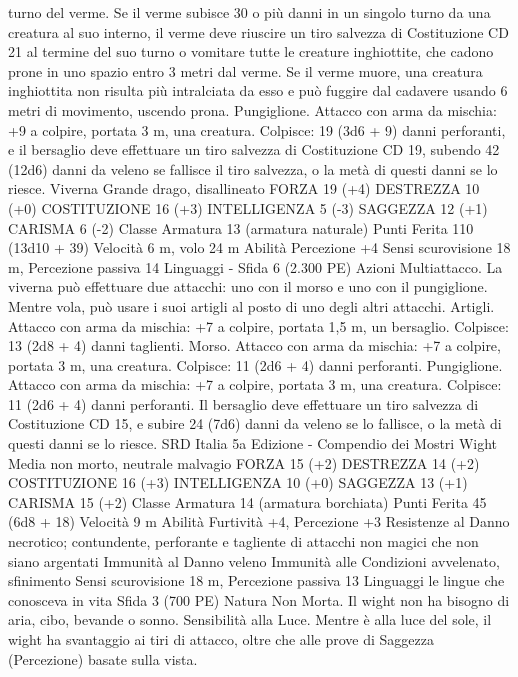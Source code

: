 \begin{multicols}{2}
turno del verme.
Se il verme subisce 30 o più danni in un singolo turno da una
creatura al suo interno, il verme deve riuscire un tiro salvezza di
Costituzione CD 21 al termine del suo turno o vomitare tutte le
creature inghiottite, che cadono prone in uno spazio entro 3 metri
dal verme. Se il verme muore, una creatura inghiottita non risulta
più intralciata da esso e può fuggire dal cadavere usando 6 metri
di movimento, uscendo prona.
Pungiglione. Attacco con arma da mischia: +9 a colpire, portata
3 m, una creatura.
Colpisce: 19 (3d6 + 9) danni perforanti, e il bersaglio deve
effettuare un tiro salvezza di Costituzione CD 19, subendo 42
(12d6) danni da veleno se fallisce il tiro salvezza, o la metà di
questi danni se lo riesce.
Viverna
Grande drago, disallineato
FORZA 19 (+4)
DESTREZZA 10 (+0)
COSTITUZIONE 16 (+3)
INTELLIGENZA 5 (-3)
SAGGEZZA 12 (+1)
CARISMA 6 (-2)
Classe Armatura 13 (armatura naturale)
Punti Ferita 110 (13d10 + 39)
Velocità 6 m, volo 24 m
Abilità Percezione +4
Sensi scurovisione 18 m, Percezione passiva 14
Linguaggi -
Sfida 6 (2.300 PE)
Azioni
Multiattacco. La viverna può effettuare due attacchi: uno con il
morso e uno con il pungiglione. Mentre vola, può usare i suoi
artigli al posto di uno degli altri attacchi.
Artigli. Attacco con arma da mischia: +7 a colpire, portata 1,5
m, un bersaglio.
Colpisce: 13 (2d8 + 4) danni taglienti.
Morso. Attacco con arma da mischia: +7 a colpire, portata 3 m,
una creatura.
Colpisce: 11 (2d6 + 4) danni perforanti.
Pungiglione. Attacco con arma da mischia: +7 a colpire, portata
3 m, una creatura.
Colpisce: 11 (2d6 + 4) danni perforanti. Il bersaglio deve
effettuare un tiro salvezza di Costituzione CD 15, e subire 24
(7d6) danni da veleno se lo fallisce, o la metà di questi danni se
lo riesce.
SRD Italia 5a Edizione - Compendio dei Mostri
Wight
Media non morto, neutrale malvagio
FORZA 15 (+2)
DESTREZZA 14 (+2)
COSTITUZIONE 16 (+3)
INTELLIGENZA 10 (+0)
SAGGEZZA 13 (+1)
CARISMA 15 (+2)
Classe Armatura 14 (armatura borchiata)
Punti Ferita 45 (6d8 + 18)
Velocità 9 m
Abilità Furtività +4, Percezione +3
Resistenze al Danno necrotico; contundente, perforante e
tagliente di attacchi non magici che non siano argentati
Immunità al Danno veleno
Immunità alle Condizioni avvelenato, sfinimento
Sensi scurovisione 18 m, Percezione passiva 13
Linguaggi le lingue che conosceva in vita
Sfida 3 (700 PE)
Natura Non Morta. Il wight non ha bisogno di aria, cibo,
bevande o sonno.
Sensibilità alla Luce. Mentre è alla luce del sole, il wight ha
svantaggio ai tiri di attacco, oltre che alle prove di Saggezza
(Percezione) basate sulla vista.

\end{multicols}
